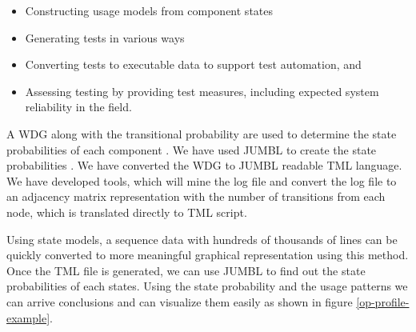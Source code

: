 \begin{itemize}
\item Constructing usage models from component states
\item Generating tests in various ways
\item Converting tests to executable data to support test automation, and
\item Assessing testing by providing test measures, including expected system reliability in the field.
\end{itemize}

A WDG along with the transitional probability are used to determine the state probabilities of each component . We have used JUMBL to create the state probabilities \cite{anil}. We have converted the WDG to JUMBL readable TML \cite{tug} language. 
We have developed tools, which will mine the log file and convert the log file to an adjacency matrix representation with the number of transitions from each node, which is translated directly to TML script. 

Using state models, a sequence data with hundreds of thousands of lines can be quickly converted to more meaningful graphical representation using this method. Once the TML file is generated, we can use JUMBL to find out the state probabilities of each states. Using the state probability and the usage patterns we can arrive conclusions and can visualize them easily as  shown in figure \ref{op-profile-example}.



%
%
%
%
%
%
%
%
%



